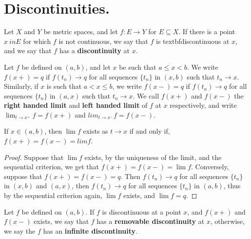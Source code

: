
\section{Discontinuities.}

\begin{definition}
    Let $X$ and  $Y$ be metric spaces, and let  $f:E \rightarrow Y$ for $E \subseteq X$.
    If there is a point $x\ in E$ for which  $f$ is not continuous, we say that  $f$ is
    textbf{discontinuous} at $x$, and we say that  $f$ has a \textbf{discontinuity} at
    $x$.
\end{definition}

\begin{definition}
    Let $f$ be defined on  $(a,b)$, and let  $x$ be such that  $a \leq x<b$. We write
    $f(x+)=q$ if $f(t_n) \rightarrow q$ for all sequences  $\{t_n\}$ in  $(x,b)$ such that
    $t_n \rightarrow x$. Similarly, if  $x$ is such that  $a<x \leq b$, we write  $f(x-)=q$ if
    $f(t_n) \rightarrow q$ for all  sequences $\{t_n\}$ in  $(a,x)$ such that $t_n \rightarrow x$.
    We call  $f(x+)$ and  $f(x-)$ the \textbf{right handed limit} and \textbf{left handed limit} of  $f$
    at  $x$ respectively, and write  $\lim_{t \rightarrow x^+}{f}=f(x+)$ and  $lim_{t \rightarrow x^-}{f}=f(x-)$.
\end{definition}

\begin{theorem}\label{5.5.1}
    If $x \in (a,b)$, then $\lim{f}$ exists as $t \rightarrow x$ if and only if,
    $f(x+)=f(x-)=lim{f}$.
\end{theorem}
\begin{proof}
    Suppose that $\lim{f}$ exists, by the uniqueness of the limit, and the sequential criterion,
    we get that $f(x+)=f(x-)=\lim{f}$. Conversely, suppose that  $f(x+)=f(x-)=q$. Then
    $f(t_n) \rightarrow q$ for all sequences $\{t_n\}$ in $(x,b)$ and $(a,x)$, then  $f(t_n) \rightarrow q$
    for all sequences  $\{t_n\}$ in  $(a,b)$, thus by the sequential criterion again, $\lim{f}$
    exists, and $\lim{f}=q$.
\end{proof}

\begin{definition}
    Let $f$ be defined on  $(a,b)$. If  $f$ is discontinuous at a point  $x$, and
    $f(x+)$ and  $f(x-)$ exists, we say that  $f$ has a \textbf{removable discontinuity} at  $x$,
    otherwise, we say the  $f$ has an \textbf{infinite discontinuity}.
\end{definition}

